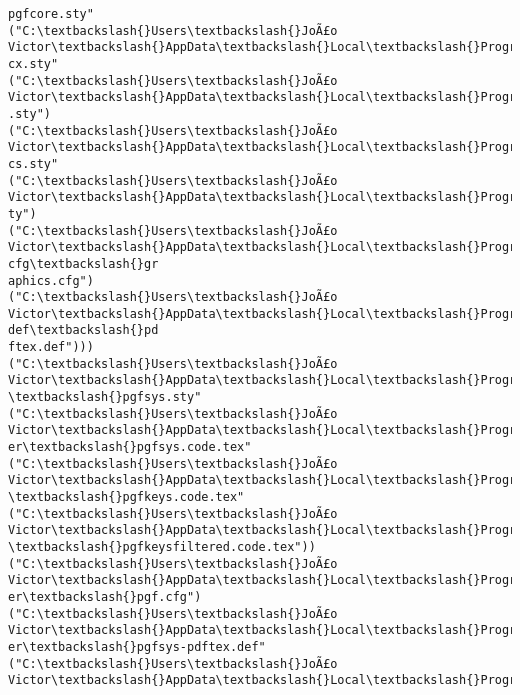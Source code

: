 \documentclass[11pt]{article}
\begin{document}
\begin{Verbatim}[commandchars=\\\{\}]
pgfcore.sty"
("C:\textbackslash{}Users\textbackslash{}JoÃ£o Victor\textbackslash{}AppData\textbackslash{}Local\textbackslash{}Programs\textbackslash{}MiKTeX\textbackslash{}tex/latex/graphics\textbackslash{}graphi
cx.sty"
("C:\textbackslash{}Users\textbackslash{}JoÃ£o Victor\textbackslash{}AppData\textbackslash{}Local\textbackslash{}Programs\textbackslash{}MiKTeX\textbackslash{}tex/latex/graphics\textbackslash{}keyval
.sty")
("C:\textbackslash{}Users\textbackslash{}JoÃ£o Victor\textbackslash{}AppData\textbackslash{}Local\textbackslash{}Programs\textbackslash{}MiKTeX\textbackslash{}tex/latex/graphics\textbackslash{}graphi
cs.sty"
("C:\textbackslash{}Users\textbackslash{}JoÃ£o Victor\textbackslash{}AppData\textbackslash{}Local\textbackslash{}Programs\textbackslash{}MiKTeX\textbackslash{}tex/latex/graphics\textbackslash{}trig.s
ty")
("C:\textbackslash{}Users\textbackslash{}JoÃ£o Victor\textbackslash{}AppData\textbackslash{}Local\textbackslash{}Programs\textbackslash{}MiKTeX\textbackslash{}tex/latex/graphics-cfg\textbackslash{}gr
aphics.cfg")
("C:\textbackslash{}Users\textbackslash{}JoÃ£o Victor\textbackslash{}AppData\textbackslash{}Local\textbackslash{}Programs\textbackslash{}MiKTeX\textbackslash{}tex/latex/graphics-def\textbackslash{}pd
ftex.def")))
("C:\textbackslash{}Users\textbackslash{}JoÃ£o Victor\textbackslash{}AppData\textbackslash{}Local\textbackslash{}Programs\textbackslash{}MiKTeX\textbackslash{}tex/latex/pgf/systemlayer
\textbackslash{}pgfsys.sty"
("C:\textbackslash{}Users\textbackslash{}JoÃ£o Victor\textbackslash{}AppData\textbackslash{}Local\textbackslash{}Programs\textbackslash{}MiKTeX\textbackslash{}tex/generic/pgf/systemlay
er\textbackslash{}pgfsys.code.tex"
("C:\textbackslash{}Users\textbackslash{}JoÃ£o Victor\textbackslash{}AppData\textbackslash{}Local\textbackslash{}Programs\textbackslash{}MiKTeX\textbackslash{}tex/generic/pgf/utilities
\textbackslash{}pgfkeys.code.tex"
("C:\textbackslash{}Users\textbackslash{}JoÃ£o Victor\textbackslash{}AppData\textbackslash{}Local\textbackslash{}Programs\textbackslash{}MiKTeX\textbackslash{}tex/generic/pgf/utilities
\textbackslash{}pgfkeysfiltered.code.tex"))
("C:\textbackslash{}Users\textbackslash{}JoÃ£o Victor\textbackslash{}AppData\textbackslash{}Local\textbackslash{}Programs\textbackslash{}MiKTeX\textbackslash{}tex/generic/pgf/systemlay
er\textbackslash{}pgf.cfg")
("C:\textbackslash{}Users\textbackslash{}JoÃ£o Victor\textbackslash{}AppData\textbackslash{}Local\textbackslash{}Programs\textbackslash{}MiKTeX\textbackslash{}tex/generic/pgf/systemlay
er\textbackslash{}pgfsys-pdftex.def"
("C:\textbackslash{}Users\textbackslash{}JoÃ£o Victor\textbackslash{}AppData\textbackslash{}Local\textbackslash{}Programs\textbackslash{}MiKTeX\textbackslash{}tex/generic/pgf/systemlay

\end{Verbatim}
\end{document}
